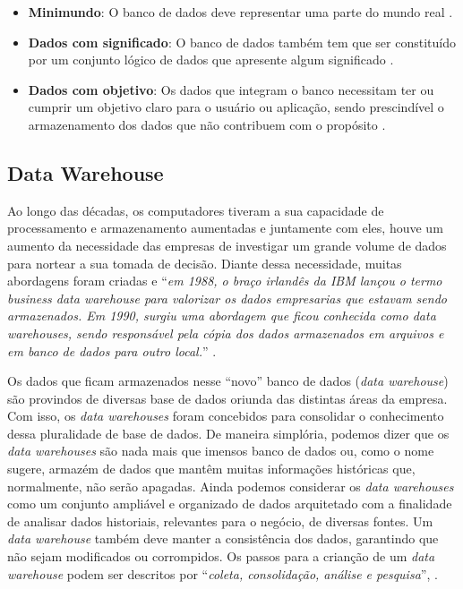 \begin{itemize}
  \item \textbf{Minimundo}: O banco de dados deve representar uma parte do mundo real \cite{vida2021datawarehouse}.
  \item \textbf{Dados com significado}: O banco de dados também tem que ser constituído por um conjunto lógico de dados que apresente algum significado \cite{vida2021datawarehouse}.
  \item \textbf{Dados com objetivo}: Os dados que integram o banco necessitam ter ou cumprir um objetivo claro para o usuário ou aplicação, sendo prescindível o armazenamento dos dados que não contribuem com o propósito \cite{vida2021datawarehouse}.
\end{itemize} 


\subsection{Data Warehouse}
\label{subsec:datawarehouse}

Ao longo das décadas, os computadores tiveram a sua capacidade de processamento e armazenamento aumentadas e juntamente com eles, houve um aumento da necessidade das empresas de investigar um grande volume de dados para nortear a sua tomada de decisão. Diante dessa necessidade, muitas abordagens foram criadas e \enquote{\textit{em 1988, o braço irlandês da IBM lançou o termo business data warehouse para valorizar os dados empresarias que estavam sendo armazenados. Em 1990, surgiu uma abordagem que ficou conhecida como data warehouses, sendo responsável pela cópia dos dados armazenados em arquivos e em banco de dados para outro local.}} \cite{vida2021datawarehouse}.

Os dados que ficam armazenados nesse \enquote{novo} banco de dados (\textit{data warehouse}) são provindos de diversas base de dados oriunda das distintas áreas da empresa. Com isso, os \textit{data warehouses} foram concebidos para consolidar o conhecimento dessa pluralidade de base de dados. De maneira simplória, podemos dizer que os \textit{data warehouses} são nada mais que imensos banco de dados ou, como o nome sugere, armazém de dados que mantêm muitas informações históricas que, normalmente, não serão apagadas. Ainda podemos considerar os \textit{data warehouses} como um conjunto ampliável e organizado de dados arquitetado com a finalidade de analisar dados historiais, relevantes para o negócio, de diversas fontes. Um \textit{data warehouse} também deve manter a consistência dos dados, garantindo que não sejam modificados ou corrompidos. Os passos para a crianção de um \textit{data warehouse} podem ser descritos por \enquote{\textit{coleta, consolidação, análise e pesquisa}}, \cite{vida2021datawarehouse}.

